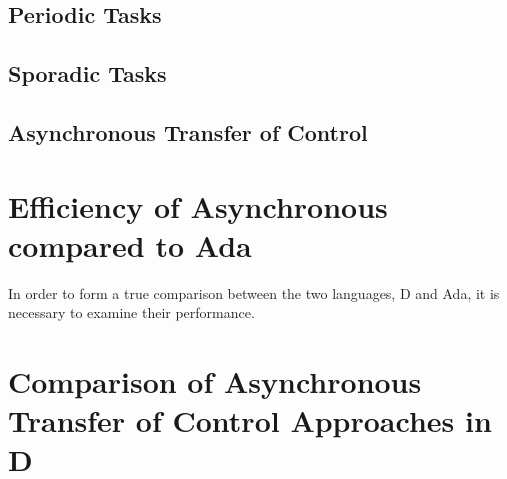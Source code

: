\subsection{Periodic Tasks}

\subsection{Sporadic Tasks}

\subsection{Asynchronous Transfer of Control}

\section{Efficiency of Asynchronous compared to Ada}
In order to form a true comparison between the two languages, D and Ada, it is
necessary to examine their performance.

\section{Comparison of Asynchronous Transfer of Control Approaches in D}
